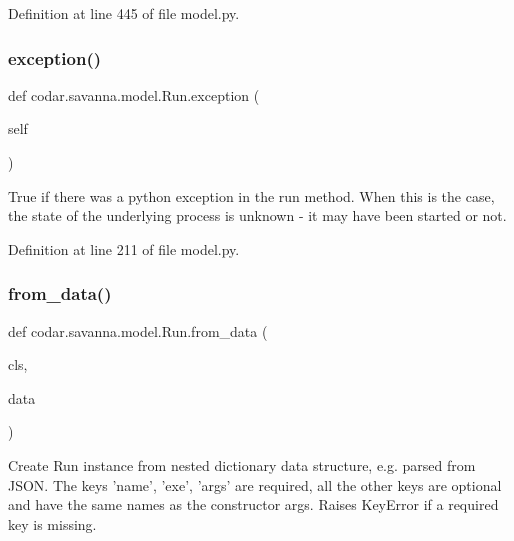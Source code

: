 Definition at line 445 of file model.\+py.

\mbox{\label{classcodar_1_1savanna_1_1model_1_1_run_a3e764a9c156037997b107a268716cf7e}} 
\subsubsection{\texorpdfstring{exception()}{exception()}}
{\footnotesize\ttfamily def codar.\+savanna.\+model.\+Run.\+exception (\begin{DoxyParamCaption}\item[{}]{self }\end{DoxyParamCaption})}

\begin{DoxyVerb}True if there was a python exception in the run method. When this
is the case, the state of the underlying process is unknown - it may
have been started or not.\end{DoxyVerb}
 

Definition at line 211 of file model.\+py.

\mbox{\label{classcodar_1_1savanna_1_1model_1_1_run_a8fab27229098b129079844b82035eab2}} 
\subsubsection{\texorpdfstring{from\+\_\+data()}{from\_data()}}
{\footnotesize\ttfamily def codar.\+savanna.\+model.\+Run.\+from\+\_\+data (\begin{DoxyParamCaption}\item[{}]{cls,  }\item[{}]{data }\end{DoxyParamCaption})}

\begin{DoxyVerb}Create Run instance from nested dictionary data structure, e.g.
parsed from JSON. The keys 'name', 'exe', 'args' are required, all the
other keys are optional and have the same names as the constructor
args. Raises KeyError if a required key is missing.\end{DoxyVerb}
 

